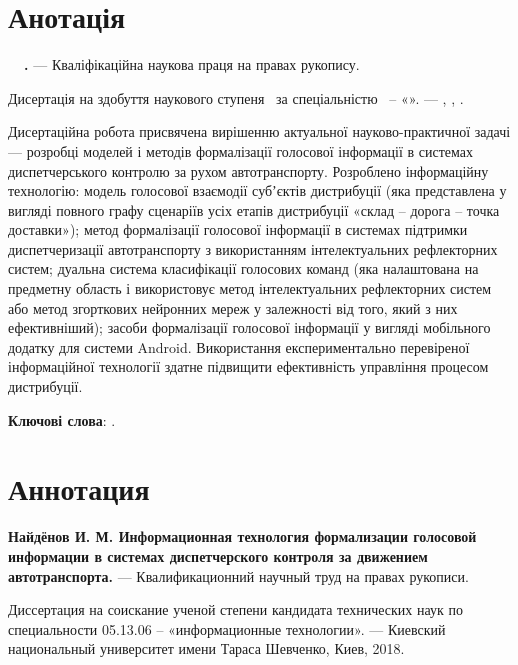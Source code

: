 \section*{Анотація}

\textbf{\thesisAuthorLastName~\thesisAuthorInitials\ \thesisTitle.} --- Кваліфікаційна наукова праця на
правах рукопису.

Дисертація на здобуття наукового ступеня \thesisDegree\ за
спеціальністю \thesisSpecialtyNumber\ – «\thesisSpecialtyTitle». --- \thesisOrganizationDone, \thesisCity, \thesisYear.

Дисертаційна робота присвячена вирішенню актуальної науково-практичної задачі --- розробці моделей і методів формалізації голосової інформації в системах диспетчерського контролю за рухом автотранспорту. Розроблено інформаційну технологію: модель голосової взаємодії субʼєктів дистрибуції (яка представлена у вигляді повного графу сценаріїв усіх етапів дистрибуції «склад – дорога – точка доставки»); метод формалізації голосової інформації в системах підтримки диспетчеризації автотранспорту з використанням інтелектуальних рефлекторних систем; дуальна система класифікації голосових команд (яка налаштована на предметну область і використовує метод інтелектуальних рефлекторних систем або метод згорткових нейронних мереж у залежності від того, який з них ефективніший); засоби формалізації голосової інформації у вигляді мобільного додатку для системи Android. Використання експериментально перевіреної інформаційної технології здатне підвищити ефективність управління процесом дистрибуції.

\textbf{Ключові слова}: \keywords.

\section*{Аннотация}

\textbf{Найдёнов И. М. Информационная технология формализации голосовой информации в системах диспетчерского контроля за движением автотранспорта.} --- Квалификационний научный труд на правах рукописи.

Диссертация на соискание ученой степени кандидата технических наук по специальности 05.13.06 -- «информационные технологии». --- Киевский национальный университет имени Тараса Шевченко, Киев, 2018.

